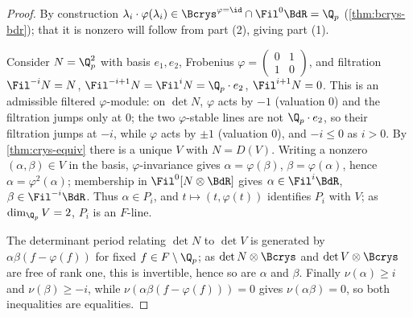 \begin{proof}
  By construction \(\lambda_i \cdot \varphi(\lambda_i) \in \Bcrys^{\varphi=\id}
  \cap \Fil^0 \BdR = \Q_p\) (\cref{thm:bcrys-bdr}); that it is nonzero will
  follow from part (2), giving part (1).

  Consider \(N = \Q_p^2\) with basis \(e_1, e_2\), Frobenius
  \(\varphi = \left(\begin{smallmatrix} 0 & 1 \\ 1 & 0 \end{smallmatrix}\right)\),
  and filtration \(\Fil^{-i} N = N\),
  \(\Fil^{-i+1} N = \Fil^i N = \Q_p \cdot e_2\), \(\Fil^{i+1} N = 0\). This is an
  admissible filtered \(\varphi\)-module: on \(\det N\), \(\varphi\) acts by
  \(-1\) (valuation \(0\)) and the filtration jumps only at \(0\); the two
  \(\varphi\)-stable lines are not \(\Q_p \cdot e_2\), so their filtration jumps
  at \(-i\), while \(\varphi\) acts by \(\pm 1\) (valuation \(0\)), and
  \(-i \leq 0\) as \(i > 0\). By \cref{thm:crys-equiv} there is a unique \(V\)
  with \(N = D(V)\). Writing a nonzero \((\alpha, \beta) \in V\) in the basis,
  \(\varphi\)-invariance gives \(\alpha = \varphi(\beta)\),
  \(\beta = \varphi(\alpha)\), hence \(\alpha = \varphi^2(\alpha)\); membership
  in \(\Fil^0[N \otimes \BdR]\) gives \(\alpha \in \Fil^i \BdR\),
  \(\beta \in \Fil^{-i} \BdR\). Thus \(\alpha \in P_i\), and \(t \mapsto (t,
  \varphi(t))\) identifies \(P_i\) with \(V\); as \(\dim_{\Q_p} V = 2\), \(P_i\)
  is an \(F\)-line.

  The determinant period relating \(\det N\) to \(\det V\) is generated by
  \(\alpha\beta(f - \varphi(f))\) for fixed \(f \in F \setminus \Q_p\); as
  \(\det N \otimes \Bcrys\) and \(\det V \otimes \Bcrys\) are free of rank one,
  this is invertible, hence so are \(\alpha\) and \(\beta\). Finally
  \(\nu(\alpha) \geq i\) and \(\nu(\beta) \geq -i\), while
  \(\nu(\alpha\beta(f - \varphi(f))) = 0\) gives \(\nu(\alpha\beta) = 0\), so
  both inequalities are equalities.
\end{proof}

